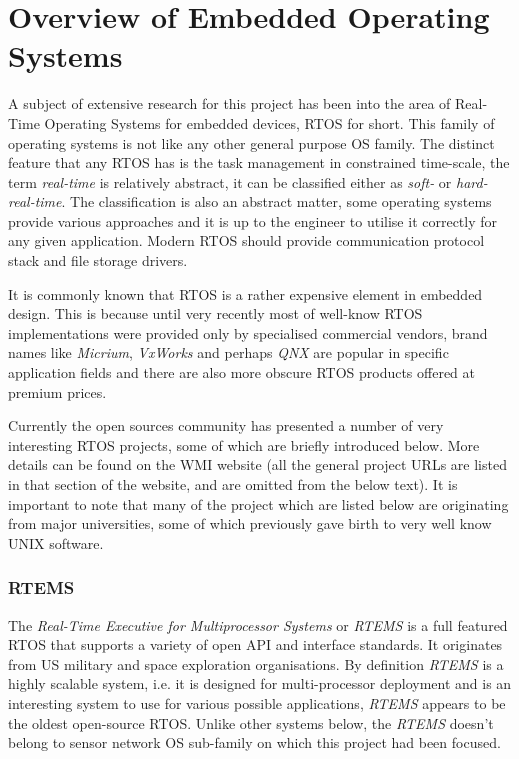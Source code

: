 \section{Overview of Embedded Operating Systems} \label{sec:RTOS}


   A subject of extensive research for this project has been into the
  area of Real-Time Operating Systems for embedded devices, RTOS for short.
  This family of operating systems is not like any other general
  purpose OS family. The distinct feature that any RTOS has is the task
  management in constrained time-scale, the term \emph{real-time} is relatively
  abstract, it can be classified either as \emph{soft-} or \emph{hard-real-time}.
  The classification is also an abstract matter, some operating systems provide
  various approaches and it is up to the engineer to utilise it correctly for
  any given application. Modern RTOS should provide communication
  protocol stack and file storage drivers.
 
 It is commonly known that RTOS is a rather expensive element in embedded design.
 This is because until very recently most of well-know RTOS implementations were
 provided only by specialised commercial vendors, brand names like \emph{Micrium},
 \emph{VxWorks} and perhaps \emph{QNX} are popular in specific application fields
 and there are also more obscure RTOS products offered at premium prices.

 Currently the open sources community has presented a number of very interesting
 RTOS projects, some of which are briefly introduced below. More details can be
 found on the WMI website \cite{wmi:wiki:rtos} (all the general project URLs are
 listed in that section of the website, and are omitted from the below text).
 It is important to note that many of the project which are listed below
 are originating from major universities, some of which previously gave
 birth to very well know UNIX software.


 \subsubsection{RTEMS} \label{sec:rtos:rtems}

 The \emph{Real-Time Executive for Multiprocessor Systems} or \emph{RTEMS} is a
 full featured RTOS that supports a variety of open API and interface standards.
 It originates from US military and space exploration organisations. By definition
 \emph{RTEMS} is a highly scalable system, i.e. it is designed for multi-processor 
 deployment and is an interesting system to use for various possible applications,
 \emph{RTEMS} appears to be the oldest open-source RTOS. Unlike other systems below,
 the \emph{RTEMS} doesn't belong to sensor network OS sub-family on which this
 project had been focused. 


